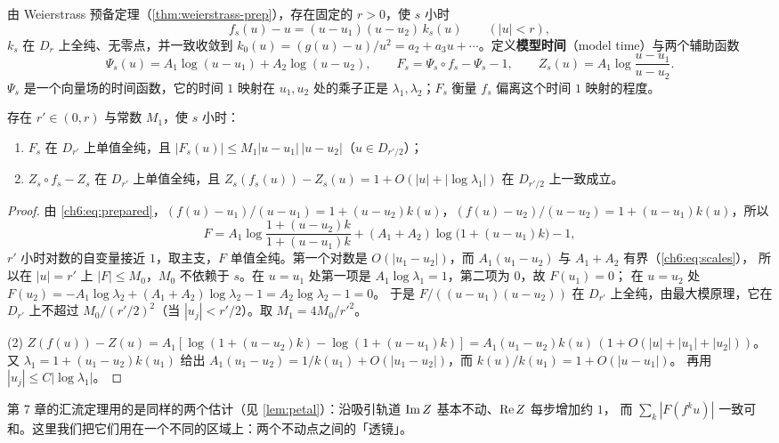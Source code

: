 由 Weierstrass 预备定理（\cref{thm:weierstrass-prep}），存在固定的 $r>0$，使 $s$ 小时
\begin{equation}\label{ch6:eq:prepared}
 f_s(u)-u=(u-u_1)(u-u_2)\,k_s(u)\qquad(|u|<r),
\end{equation}
$k_s$ 在 $D_r$ 上全纯、无零点，并一致收敛到 $k_0(u)=(g(u)-u)/u^2=a_2+a_3u+\cdots$。定义\textbf{模型时间}（model time）与两个辅助函数
\[
 \Psi_s(u)=A_1\log(u-u_1)+A_2\log(u-u_2),\qquad
 F_s=\Psi_s\circ f_s-\Psi_s-1,\qquad
 Z_s(u)=A_1\log\frac{u-u_1}{u-u_2}.
\]
$\Psi_s$ 是一个向量场的时间函数，它的时间 $1$ 映射在 $u_1,u_2$ 处的乘子正是 $\lambda_1,\lambda_2$；$F_s$ 衡量 $f_s$ 偏离这个时间 $1$ 映射的程度。

\begin{lemma}[一步误差]\label{ch6:lem:model}
存在 $r'\in(0,r)$ 与常数 $M_1$，使 $s$ 小时：
\begin{enumerate}
\item $F_s$ 在 $D_{r'}$ 上单值全纯，且 $|F_s(u)|\le M_1|u-u_1|\,|u-u_2|$（$u\in D_{r'/2}$）；
\item $Z_s\circ f_s-Z_s$ 在 $D_{r'}$ 上单值全纯，且 $Z_s(f_s(u))-Z_s(u)=1+O(|u|+|\log\lambda_1|)$ 在 $D_{r'/2}$ 上一致成立。
\end{enumerate}
\end{lemma}

\begin{proof}
由 \eqref{ch6:eq:prepared}，$(f(u)-u_1)/(u-u_1)=1+(u-u_2)k(u)$，$(f(u)-u_2)/(u-u_2)=1+(u-u_1)k(u)$，所以
\[
 F=A_1\log\frac{1+(u-u_2)k}{1+(u-u_1)k}+(A_1+A_2)\log\bigl(1+(u-u_1)k\bigr)-1 ,
\]
$r'$ 小时对数的自变量接近 $1$，取主支，$F$ 单值全纯。第一个对数是 $O(|u_1-u_2|)$，而 $A_1(u_1-u_2)$ 与 $A_1+A_2$ 有界（\eqref{ch6:eq:scales}），
所以在 $|u|=r'$ 上 $|F|\le M_0$，$M_0$ 不依赖于 $s$。在 $u=u_1$ 处第一项是 $A_1\log\lambda_1=1$，第二项为 $0$，故 $F(u_1)=0$；
在 $u=u_2$ 处 $F(u_2)=-A_1\log\lambda_2+(A_1+A_2)\log\lambda_2-1=A_2\log\lambda_2-1=0$。
于是 $F/((u-u_1)(u-u_2))$ 在 $D_{r'}$ 上全纯，由最大模原理，它在 $D_{r'}$ 上不超过 $M_0/(r'/2)^2$（当 $|u_j|<r'/2$）。取 $M_1=4M_0/r'^2$。

(2) $Z(f(u))-Z(u)=A_1[\log(1+(u-u_2)k)-\log(1+(u-u_1)k)]=A_1(u_1-u_2)k(u)\,(1+O(|u|+|u_1|+|u_2|))$。
又 $\lambda_1=1+(u_1-u_2)k(u_1)$ 给出 $A_1(u_1-u_2)=1/k(u_1)+O(|u_1-u_2|)$，而 $k(u)/k(u_1)=1+O(|u-u_1|)$。
再用 $|u_j|\le C|\log\lambda_1|$。
\end{proof}

\begin{remark}
第 7 章的汇流定理用的是同样的两个估计（见 \cref{lem:petal}）：沿吸引轨道 $\operatorname{Im} Z$ 基本不动、$\operatorname{Re} Z$ 每步增加约 $1$，
而 $\sum_k|F(f^ku)|$ 一致可和。这里我们把它们用在一个不同的区域上：两个不动点之间的「透镜」。
\end{remark}

